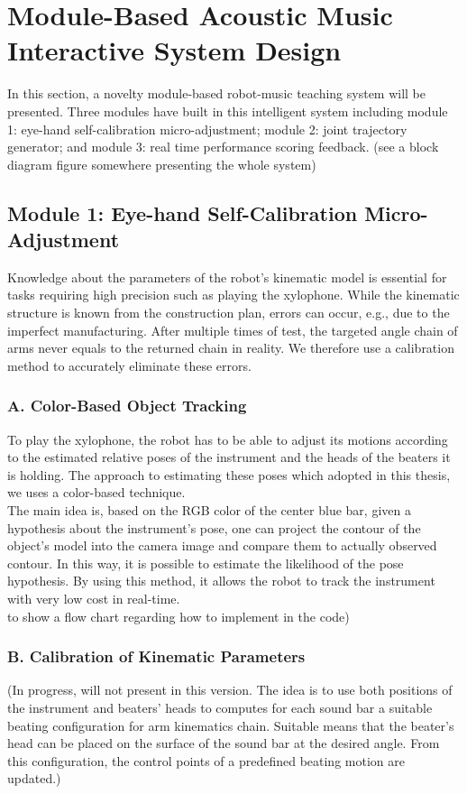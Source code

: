 \section{Module-Based Acoustic Music Interactive System Design}
In this section, a novelty module-based robot-music teaching system will be presented. 
Three modules have built in this intelligent system including module 1: eye-hand 
self-calibration micro-adjustment; module 2: joint trajectory generator; and 
module 3: real time performance scoring feedback. (see a block diagram figure 
somewhere presenting the whole system)

\subsection{Module 1: Eye-hand Self-Calibration Micro-Adjustment}
Knowledge about the parameters of the robot's kinematic model is essential for 
tasks requiring high precision such as playing the xylophone. While the kinematic 
structure is known from the construction plan, errors can occur, e.g., due to the 
imperfect manufacturing. After multiple times of test, the targeted angle chain 
of arms never equals to the returned chain in reality. We therefore use a 
calibration method to accurately eliminate these errors.\\
 

\subsubsection{A. Color-Based Object Tracking}
To play the xylophone, the robot has to be able to adjust its motions according to
the estimated relative poses of the instrument and the heads of the beaters it is 
holding. The approach to estimating these poses which adopted in this thesis, we 
uses a color-based technique.\\
The main idea is, based on the RGB color of the center blue bar, given a hypothesis 
about the instrument's pose, one can project the contour of the object's model into the 
camera image and compare them to actually observed contour. In this way, it is possible 
to estimate the likelihood of the pose hypothesis. By using this method, it allows
the robot to track the instrument with very low cost in real-time.\\
to show a flow chart regarding how to implement in the code)

\subsubsection{B. Calibration of Kinematic Parameters}
(In progress, will not present in this version. The idea is to use both positions 
of the instrument and beaters' heads to computes for each sound bar a suitable 
beating configuration for arm kinematics chain. Suitable means that the beater's 
head can be placed on the surface of the sound bar at the desired angle. From 
this configuration, the control points of a predefined beating motion are updated.)\\ 

